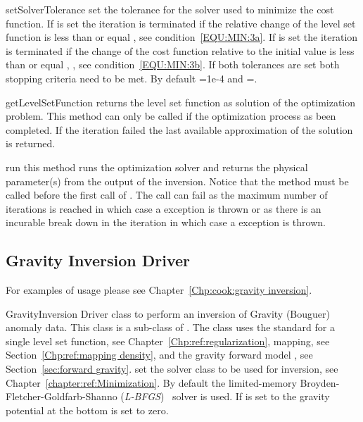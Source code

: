 \begin{methoddesc}[InversionDriver]{setSolverTolerance}{ }
set the tolerance for the solver used to minimize the cost function. If  is set the iteration is terminated 
if the relative change of the level set function is less than or equal , see condition~\ref{EQU:MIN:3a}. 
If  is set the iteration is terminated if the change of the cost
function relative to the initial value is less than or equal , , see condition~\ref{EQU:MIN:3b}.
If both tolerances are set both stopping criteria need to be met.
By default =1e-4 and =\None.
\end{methoddesc}

\begin{methoddesc}[InversionDriver]{getLevelSetFunction}{}
returns the level set function as solution of the optimization problem.
This method can only be called if the optimization process as been completed.
If the iteration failed the last available approximation of the solution is returned.
\end{methoddesc}
        
\begin{methoddesc}[InversionDriver]{run}{}
this method runs the optimization solver and returns the physical parameter(s)
from the output of the inversion. Notice that the  method must be
called before the first call of .
The call can fail as the maximum number of iterations is reached in which case
a  exception is thrown or as there is an
incurable break down in the iteration in which case a  exception is thrown. 
\end{methoddesc}

\subsection{Gravity Inversion Driver}
For examples of usage please see Chapter~\ref{Chp:cook:gravity inversion}.

\begin{classdesc}{GravityInversion}{
}
Driver class to perform an inversion of Gravity (Bouguer) anomaly data.
This class is a sub-class of . The class uses the
standard  for a single level set function,
see Chapter~\ref{Chp:ref:regularization},  mapping,
see Section~\ref{Chp:ref:mapping density}, and the gravity forward model
, see Section~\ref{sec:forward gravity}.
 set the solver class to be used for inversion,
see Chapter~\ref{chapter:ref:Minimization}.
 By default the limited-memory Broyden-Fletcher-Goldfarb-Shanno (\emph{L-BFGS})~\cite{Nocedal1980} solver is used.
If  is set to \True the gravity potential at the bottom is set to zero.
\end{classdesc}

